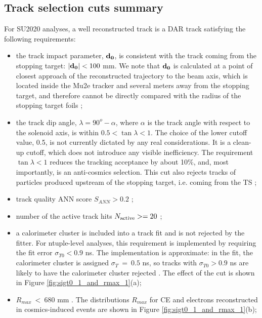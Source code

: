 \subsection{Track selection cuts summary}
\label{sec:track-selection_cuts_summary}
  
For SU2020 analyses, a well reconstructed track is a DAR track satisfying the following requirements:

\begin{itemize}
\item
  the track impact parameter, ${\bf d_0}$, is consistent with the track coming from the stopping target: 
  ${\bf |d_0|} < 100$ mm. We note that ${\bf d_0}$ is calculated at a point of closest approach of
  the reconstructed trajectory to the beam axis, which is located inside the Mu2e tracker and 
  several meters away from the stopping target,
  and therefore cannot be directly compared with the radius of the stopping target foils ;
\item 
  the track dip angle, $\lambda = 90^o - \alpha$, where $\alpha$ is the track angle with respect 
  to the solenoid axis, is within $ 0.5 < \tan{\lambda} < 1$. 
  The choice of the lower cutoff value, 0.5, is not currently dictated by any real considerations.
  It is a clean-up cutoff, which does not introduce any visible inefficiency. 
  The requirement $\tan{\lambda} < 1$ reduces the tracking acceptance by about 10\%, 
  and, most importantly, is an anti-cosmics selection. This cut also rejects tracks of particles 
  produced upstream of the stopping target, i.e. coming from the TS ; 
\item
  track quality ANN score $S_{ANN} > 0.2$ ;
\item
  number of the active track hits $N_{\rm active} >= 20$ ;
\item
  a calorimeter cluster is included into a track fit and is not rejected by the fitter. For ntuple-level analyses,
  this requirement is implemented by requiring the fit error $\sigma_{T0} < 0.9$ ns.
  The implementation is approximate: in the fit, the calorimeter cluster is assigned $\sigma_T ~=~ 0.5$ ns,
  so tracks with $\sigma_{T0} > 0.9$ ns are likely to have the calorimeter cluster rejected .
  The effect of the cut is shown in Figure \ref{fig:sigt0_1_and_rmax_1}(a);
\item
  $R_{max} ~<~ 680$ mm . The distributions $R_{max}$ for CE and electrons reconstructed in cosmics-induced events
  are shown in Figure \ref{fig:sigt0_1_and_rmax_1}(b);

\end{itemize}

